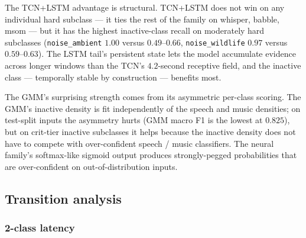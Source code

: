 The TCN+LSTM advantage is structural.
TCN+LSTM does not win on any individual hard subclass — it ties the rest of the family on whisper, babble, msom — but it has the highest inactive-class recall on moderately hard subclasses (\texttt{noise\_ambient} $1.00$ versus $0.49$--$0.66$, \texttt{noise\_wildlife} $0.97$ versus $0.59$--$0.63$).
The LSTM tail's persistent state lets the model accumulate evidence across longer windows than the TCN's $4.2$-second receptive field, and the inactive class — temporally stable by construction — benefits most.

The GMM's surprising strength comes from its asymmetric per-class scoring.
The GMM's inactive density is fit independently of the speech and music densities; on test-split inputs the asymmetry hurts (GMM macro F1 is the lowest at $0.825$), but on crit-tier inactive subclasses it helps because the inactive density does not have to compete with over-confident speech / music classifiers.
The neural family's softmax-like sigmoid output produces strongly-pegged probabilities that are over-confident on out-of-distribution inputs.

\subsection{Transition analysis}
\label{sec:exp_transitions_results}

\subsubsection*{2-class latency}

